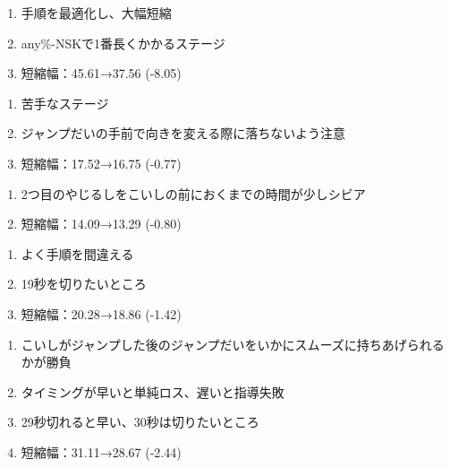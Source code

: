 \begin{enumerate}[label={\sarrow}]
\item 手順を最適化し、大幅短縮
\item any\%-NSKで1番長くかかるステージ
\item 短縮幅：45.61→37.56 (-8.05)
\end{enumerate}



\begin{enumerate}[label={\sarrow}]
\item 苦手なステージ
\item ジャンプだいの手前で向きを変える際に落ちないよう注意
\item 短縮幅：17.52→16.75 (-0.77)
\end{enumerate}



\begin{enumerate}[label={\sarrow}]
\item 2つ目のやじるしをこいしの前におくまでの時間が少しシビア
\item 短縮幅：14.09→13.29 (-0.80)
\end{enumerate}



\begin{enumerate}[label={\sarrow}]
\item よく手順を間違える
\item 19秒を切りたいところ
\item 短縮幅：20.28→18.86 (-1.42)
\end{enumerate}



\clearpage
\begin{enumerate}[label={\sarrow}]
\item こいしがジャンプした後のジャンプだいをいかにスムーズに持ちあげられるかが勝負
\item タイミングが早いと単純ロス、遅いと指導失敗
\item 29秒切れると早い、30秒は切りたいところ
\item 短縮幅：31.11→28.67 (-2.44)
\end{enumerate}



